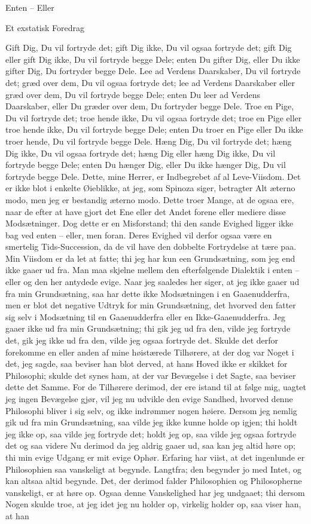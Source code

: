 \documentclass[12pt,a4paper]{article}
\begin{document}
Enten – Eller

Et exstatisk Foredrag

Gift Dig, Du vil fortryde det; gift Dig ikke, Du vil ogsaa fortryde det; gift Dig eller gift Dig ikke, Du vil fortryde begge Dele; enten Du gifter Dig, eller Du ikke gifter Dig, Du fortryder begge Dele. Lee ad Verdens Daarskaber, Du vil fortryde det; græd over dem, Du vil ogsaa fortryde det; lee ad Verdens Daarskaber eller græd over dem, Du vil fortryde begge Dele; enten Du leer ad Verdens Daarskaber, eller Du græder over dem, Du fortryder begge Dele. Troe en Pige, Du vil fortryde det; troe hende ikke, Du vil ogsaa fortryde det; troe en Pige eller troe hende ikke, Du vil fortryde begge Dele; enten Du troer en Pige eller Du ikke troer hende, Du vil fortryde begge Dele. Hæng Dig, Du vil fortryde det; hæng Dig ikke, Du vil ogsaa fortryde det; hæng Dig eller hæng Dig ikke, Du vil fortryde begge Dele; enten Du hænger Dig, eller Du ikke hænger Dig, Du vil fortryde begge Dele. Dette, mine Herrer, er Indbegrebet af al Leve-Viisdom. Det er ikke blot i enkelte Øieblikke, at jeg, som Spinoza siger, betragter Alt æterno modo, men jeg er bestandig æterno modo. Dette troer Mange, at de ogsaa ere, naar de efter at have gjort det Ene eller det Andet forene eller mediere disse Modsætninger. Dog dette er en Misforstand; thi den sande Evighed ligger ikke bag ved enten – eller, men foran. Deres Evighed vil derfor ogsaa være en smertelig Tids-Succession, da de vil have den dobbelte Fortrydelse at tære paa. Min Viisdom er da let at fatte; thi jeg har kun een Grundsætning, som jeg end ikke gaaer ud fra. Man maa skjelne mellem den efterfølgende Dialektik i enten – eller og den her antydede evige. Naar jeg saaledes her siger, at jeg ikke gaaer ud fra min Grundsætning, saa har dette ikke Modsætningen i en Gaaenudderfra, men er blot det negative Udtryk for min Grundsætning, det hvorved den fatter sig selv i Modsætning til en Gaaenudderfra eller en Ikke-Gaaenudderfra. Jeg gaaer ikke ud fra min Grundsætning; thi gik jeg ud fra den, vilde jeg fortryde det, gik jeg ikke ud fra den, vilde jeg ogsaa fortryde det. Skulde det derfor forekomme en eller anden af mine høistærede Tilhørere, at der dog var Noget i det, jeg sagde, saa beviser han blot derved, at hans Hoved ikke er skikket for Philosophi; skulde det synes ham, at der var Bevægelse i det Sagte, saa beviser dette det Samme. For de Tilhørere derimod, der ere istand til at følge mig, uagtet jeg ingen Bevægelse gjør, vil jeg nu udvikle den evige Sandhed, hvorved denne Philosophi bliver i sig selv, og ikke indrømmer nogen høiere. Dersom jeg nemlig gik ud fra min Grundsætning, saa vilde jeg ikke kunne holde op igjen; thi holdt jeg ikke op, saa vilde jeg fortryde det; holdt jeg op, saa vilde jeg ogsaa fortryde det og saa videre Nu derimod da jeg aldrig gaaer ud, saa kan jeg altid høre op; thi min evige Udgang er mit evige Ophør. Erfaring har viist, at det ingenlunde er Philosophien saa vanskeligt at begynde. Langtfra; den begynder jo med Intet, og kan altsaa altid begynde. Det, der derimod falder Philosophien og Philosopherne vanskeligt, er at høre op. Ogsaa denne Vanskelighed har jeg undgaaet; thi dersom Nogen skulde troe, at jeg idet jeg nu holder op, virkelig holder op, saa viser han, at han 
\end{document}
